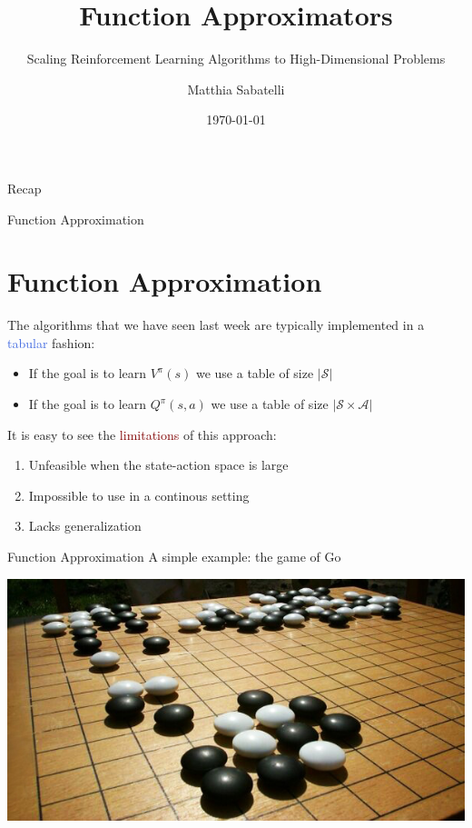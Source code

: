 \documentclass{beamer}
\title{Function Approximators}
\subtitle{Scaling Reinforcement Learning Algorithms to High-Dimensional Problems}
\author{Matthia Sabatelli}
\date{\today}
\begin{document}
\frame{\titlepage} 

\begin{frame}{Recap}

\end{frame}




\begin{frame}{Function Approximation}
	\section{Function Approximation}

	The algorithms that we have seen last week are typically implemented in a \textcolor{RoyalBlue}{tabular} fashion:
	\begin{itemize}
		\item If the goal is to learn $V^{\pi}(s)$ we use a table of size $|\mathcal{S}|$
		\item If the goal is to learn $Q^{\pi}(s,a)$ we use a table of size $|\mathcal{S}\times\mathcal{A}|$
	\end{itemize}

	It is easy to see the \textcolor{Maroon}{limitations} of this approach:

	\begin{enumerate}
		\item Unfeasible when the state-action space is large
		\item Impossible to use in a continous setting
		\item Lacks generalization
	\end{enumerate}

\end{frame}


\begin{frame}{Function Approximation}
	A simple example: the game of Go
	\bigskip

	\begin{center}
		\includegraphics[width=\textwidth]{./Images/Go_board}
	\end{center}

\end{frame}
\end{document}
